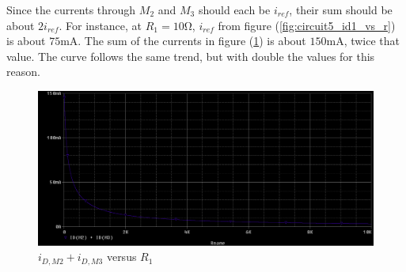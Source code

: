 \FloatBarrier

Since the currents through $M_2$ and $M_3$ should each be $i_{ref}$, their sum should be about $2i_{ref}$. For instance, at $R_1 = 10$\si{\ohm}, $i_{ref}$ from figure (\ref{fig:circuit5_id1_vs_r}) is about $75$\si{\milli\ampere}. The sum of the currents in figure (\ref{fig:circuit5_id2_plus_id3_vs_r}) is about $150$\si{\milli\ampere}, twice that value. The curve follows the same trend, but with double the values for this reason.

\FloatBarrier

\begin{figure}[h!]
	\centering
	\includegraphics[scale=0.5]{./images/circuit5_sum_r_sweep.PNG}
	\caption{$i_{D,M2} + i_{D,M3}$ versus $R_1$}
	\label{fig:circuit5_id2_plus_id3_vs_r}
\end{figure}

\FloatBarrier
